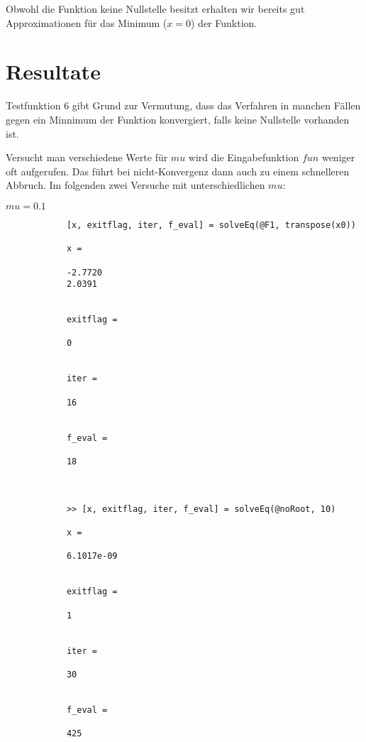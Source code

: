 \documentclass[11pt,titlepage]{article}
\begin{document}
			Obwohl die Funktion keine Nullstelle besitzt erhalten wir bereits gut Approximationen für das Minimum ($x=0$) der Funktion. 

		
	\section{Resultate}
		Testfunktion 6 gibt Grund zur Vermutung, dass das Verfahren in manchen Fällen gegen ein Minnimum der Funktion konvergiert, falls keine Nullstelle vorhanden ist. 
		
		
		Versucht man verschiedene Werte für $mu$ wird die Eingabefunktion $fun$ weniger oft aufgerufen. Das führt bei nicht-Konvergenz dann auch zu einem schnelleren Abbruch. Im folgenden zwei Versuche mit unterschiedlichen $mu$:
		
		$mu = 0.1$
		\begin{lstlisting}
			[x, exitflag, iter, f_eval] = solveEq(@F1, transpose(x0))
			
			x =
			
			-2.7720
			2.0391
			
			
			exitflag =
			
			0
			
			
			iter =
			
			16
			
			
			f_eval =
			
			18
			
			
			
			>> [x, exitflag, iter, f_eval] = solveEq(@noRoot, 10)
			
			x =
			
			6.1017e-09
			
			
			exitflag =
			
			1
			
			
			iter =
			
			30
			
			
			f_eval =
			
			425
			
			
		\end{lstlisting}
	
\end{document}
